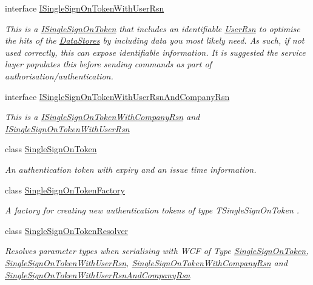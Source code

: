 \begin{DoxyCompactItemize}
interface \hyperlink{interfaceCqrs_1_1Authentication_1_1ISingleSignOnTokenWithUserRsn}{I\+Single\+Sign\+On\+Token\+With\+User\+Rsn}
\begin{DoxyCompactList}\small\item\em This is a \hyperlink{interfaceCqrs_1_1Authentication_1_1ISingleSignOnToken}{I\+Single\+Sign\+On\+Token} that includes an identifiable \hyperlink{interfaceCqrs_1_1Authentication_1_1ISingleSignOnTokenWithUserRsn_a3ba8dbde50e032ebc76c96a5ff40f47f_a3ba8dbde50e032ebc76c96a5ff40f47f}{User\+Rsn} to optimise the hits of the \hyperlink{}{Data\+Stores} by including data you most likely need. As such, if not used correctly, this can expose identifiable information. It is suggested the service layer populates this before sending commands as part of authorisation/authentication. \end{DoxyCompactList}\item 
interface \hyperlink{interfaceCqrs_1_1Authentication_1_1ISingleSignOnTokenWithUserRsnAndCompanyRsn}{I\+Single\+Sign\+On\+Token\+With\+User\+Rsn\+And\+Company\+Rsn}
\begin{DoxyCompactList}\small\item\em This is a \hyperlink{interfaceCqrs_1_1Authentication_1_1ISingleSignOnTokenWithCompanyRsn}{I\+Single\+Sign\+On\+Token\+With\+Company\+Rsn} and \hyperlink{interfaceCqrs_1_1Authentication_1_1ISingleSignOnTokenWithUserRsn}{I\+Single\+Sign\+On\+Token\+With\+User\+Rsn} \end{DoxyCompactList}\item 
class \hyperlink{classCqrs_1_1Authentication_1_1SingleSignOnToken}{Single\+Sign\+On\+Token}
\begin{DoxyCompactList}\small\item\em An authentication token with expiry and an issue time information. \end{DoxyCompactList}\item 
class \hyperlink{classCqrs_1_1Authentication_1_1SingleSignOnTokenFactory}{Single\+Sign\+On\+Token\+Factory}
\begin{DoxyCompactList}\small\item\em A factory for creating new authentication tokens of type {\itshape T\+Single\+Sign\+On\+Token} . \end{DoxyCompactList}\item 
class \hyperlink{classCqrs_1_1Authentication_1_1SingleSignOnTokenResolver}{Single\+Sign\+On\+Token\+Resolver}
\begin{DoxyCompactList}\small\item\em Resolves parameter types when serialising with W\+CF of Type \hyperlink{classCqrs_1_1Authentication_1_1SingleSignOnToken}{Single\+Sign\+On\+Token}, \hyperlink{classCqrs_1_1Authentication_1_1SingleSignOnTokenWithUserRsn}{Single\+Sign\+On\+Token\+With\+User\+Rsn}, \hyperlink{classCqrs_1_1Authentication_1_1SingleSignOnTokenWithCompanyRsn}{Single\+Sign\+On\+Token\+With\+Company\+Rsn} and \hyperlink{classCqrs_1_1Authentication_1_1SingleSignOnTokenWithUserRsnAndCompanyRsn}{Single\+Sign\+On\+Token\+With\+User\+Rsn\+And\+Company\+Rsn} \end{DoxyCompactList}\item 

\end{DoxyCompactItemize}
